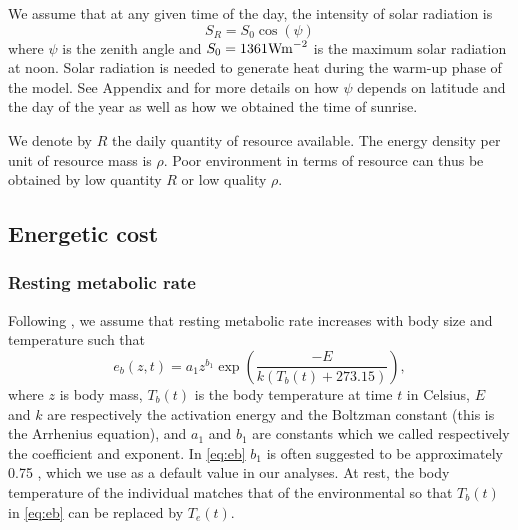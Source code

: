 We assume that  at any given time of the day, the intensity of solar radiation is \[S_R = S_0 \cos(\psi) \]
where $\psi$ is the zenith angle and $S_0 = 1361 \rm{W m}^{-2}$ is the maximum solar radiation at noon.
Solar radiation is needed to generate heat during the warm-up phase of the model.
See Appendix  and   \citet{Campbell2012} for more details on how $\psi$ depends on latitude and the day of the year as well as how we obtained the time of sunrise.

We denote by $R$ the daily quantity of resource available.
The energy density per unit of resource mass is $\rho$. 
Poor environment in terms of resource can thus be obtained by low quantity $R$ or low quality $\rho$.

\subsection*{Energetic cost}
\subsubsection*{Resting metabolic rate}
Following \citet{Brown2004}, we assume that resting metabolic rate increases with body size and temperature such that
\begin{equation} \label{eq:eb}
	e_b(z, t) = a_1 z^{b_1} \exp \left(\frac{-E}{k (T_b(t)+ 273.15)}\right),
\end{equation}
where $z$ is body mass, $T_b(t)$ is the body temperature at time $t$ in Celsius, $E$ and $k$ are respectively the activation energy and the Boltzman constant (this is the Arrhenius equation), and $a_1$ and $b_1$ are constants which we called respectively the coefficient and exponent.
In \cref{eq:eb} $b_1$ is often suggested to be approximately 0.75 \citep{Kleiber1947, Peters1986, Brown2004}, which we use as a default value in our analyses.
At rest, the body temperature of the individual matches that of the environmental \citep[e.g.,][]{Bartholomew1978} so that $T_b(t)$ in \cref{eq:eb} can be replaced by $T_e(t)$.

